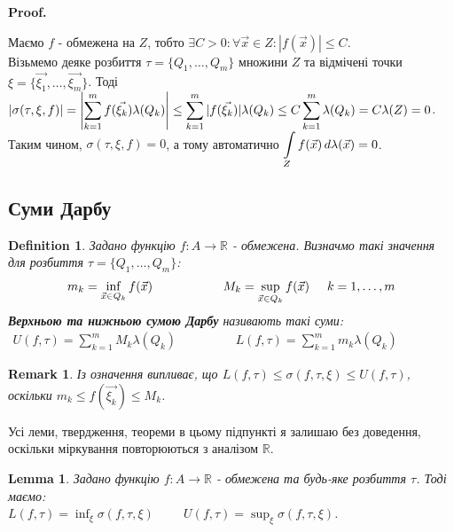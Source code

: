 \documentclass[a4paper, 10pt]{article}
\makeatletter
\def\huge{\displaystyle}
\def\qed{$\blacksquare$}
\theoremstyle{theoremdd}
\theoremstyle{theoremdd}
\newtheorem{definition}[theorem]{Definition}
\theoremstyle{theoremdd}
\theoremstyle{theoremdd}
\theoremstyle{theoremdd}
\theoremstyle{theoremdd}
\newtheorem{remark}[theorem]{Remark}
\theoremstyle{theoremdd}
\newtheorem{lemma}[theorem]{Lemma}
\theoremstyle{theoremdd}
\renewenvironment{proof}[1][Proof.\\]{\par
\pushQED{\hfill \qed}%
\normalfont \topsep6\p@\@plus6\p@\relax
\trivlist
\item\relax
{\bfseries
#1\@addpunct{.}}\hspace\labelsep\ignorespaces
}{%
\popQED\endtrivlist\@endpefalse
}
\makeatother
\begin{document}
\begin{proof}
Маємо $f$ - обмежена на $Z$, тобто $\exists C>0: \forall \vec{x} \in Z: |f(\vec{x})| \leq C$.\\
Візьмемо деяке розбиття $\tau = \{Q_1,\dots,Q_m\}$ множини $Z$ та відмічені точки $\xi = \{\vec{\xi_1},\dots,\vec{\xi_m}\}$. Тоді\\
$|\sigma(\tau,\xi,f)| = \huge \abs{\sum_{k=1}^m f(\vec{\xi_k}) \lambda(Q_k)} \leq \sum_{k=1}^m |f(\vec{\xi_k})| \lambda(Q_k) \leq C \sum_{k=1}^m \lambda(Q_k) = C \lambda(Z) = 0$.
Таким чином, $\sigma(\tau,\xi,f) = 0$, а тому автоматично $\huge\int\displaylimits_Z f(\vec{x})\,d \lambda(\vec{x}) = 0$.
\end{proof}

\subsection{Суми Дарбу}
\begin{definition}
Задано функцію $f: A \to \mathbb{R}$ - обмежена. Визначмо такі значення для розбиття $\tau = \{Q_1,\dots,Q_m\}$:
\begin{align*}
m_k = \inf_{\vec{x} \in Q_k} f(\vec{x}) \hspace{2cm} M_k = \sup_{\vec{x} \in Q_k} f(\vec{x}) \hspace{0.5cm} k=1,\dots,m
\end{align*}
\textbf{Верхньою та нижньою сумою Дарбу} називають такі суми:
\begin{align*}
U(f, \tau) = \sum_{k=1}^m M_k \lambda(Q_k) \hspace{2cm} L(f,\tau) = \sum_{k=1}^m m_k \lambda(Q_k) \hspace{2cm}
\end{align*}
\end{definition}

\begin{remark}
Із означення випливає, що $L(f,\tau) \leq \sigma(f,\tau,\xi) \leq U(f,\tau)$, оскільки $m_k \leq f(\vec{\xi_k}) \leq M_k$.
\end{remark}

Усі леми, твердження, теореми в цьому підпункті я залишаю без доведення, оскільки міркування повторюються з аналізом $\mathbb{R}$.

\begin{lemma}
Задано функцію $f: A \to \mathbb{R}$ - обмежена та будь-яке розбиття $\tau$. Тоді маємо:\\
$L(f,\tau) = \huge\inf_{\xi} \sigma(f,\tau,\xi) \hspace{1cm} U(f,\tau) = \huge\sup_{\xi} \sigma(f,\tau,\xi)$.
\end{lemma}
\end{document}
